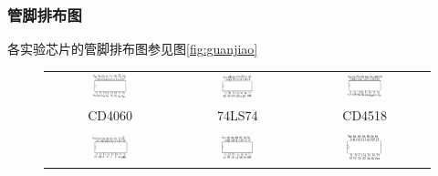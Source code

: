 \documentclass[12pt]{article}
\begin{document}
\subsubsection{管脚排布图}
各实验芯片的管脚排布图参见图\ref{fig:guanjiao}
\begin{figure}[h]
\centering
\begin{tabular}{ccc}
\includegraphics[width=0.3\textwidth]{CD4060.png}&\includegraphics[width=0.3\textwidth]{7474.png}&\includegraphics[width=0.3\textwidth]{CD4518.png}\\
CD4060&74LS74&CD4518\\
&&\\
\includegraphics[width=0.3\textwidth]{74161.png}&\includegraphics[width=0.3\textwidth]{7400.png}&\includegraphics[width=0.3\textwidth]{CD4069.png}\\

\end{tabular}
\end{figure}
\end{document}

